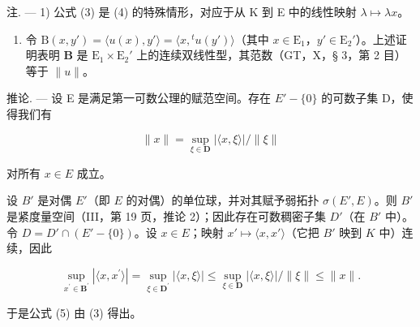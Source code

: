 注. --- 1) 公式 (3) 是 (4) 的特殊情形，对应于从 K 到 E 中的线性映射 \(\lambda \mapsto \lambda x\)。

\begin{enumerate}
\def\labelenumi{\arabic{enumi})}
\setcounter{enumi}{1}
\tightlist
\item
  令 \(\mathrm{B}(x, y') = \langle u(x), y' \rangle = \langle x, {}^t u(y') \rangle\)（其中 \(x \in \mathrm{E}_1\)，\(y' \in \mathrm{E}_2'\)）。上述证明表明 \(\mathbf{B}\) 是 \(\mathrm{E}_1 \times \mathrm{E}_2'\) 上的连续双线性型，其范数（GT，X，§ 3，第 2 目）等于 \(\| u \|\)。
\end{enumerate}

推论. --- 设 E 是满足第一可数公理的赋范空间。存在 \(E' - \{0\}\) 的可数子集 D，使得我们有

\[
\| x \| = \sup _ {\xi \in \mathbf {D}} | \langle x, \xi \rangle | / \| \xi \|\tag{5}
\]

对所有 \(x \in E\) 成立。

设 \(B'\) 是对偶 \(E'\)（即 \(E\) 的对偶）的单位球，并对其赋予弱拓扑 \(\sigma(E', E)\)。则 \(B'\) 是紧度量空间（III，第 19 页，推论 2）；因此存在可数稠密子集 \(D'\)（在 \(B'\) 中）。令 \(D = D' \cap (E' - \{0\})\)。设 \(x \in E\)；映射 \(x' \mapsto \langle x, x' \rangle\)（它把 \(B'\) 映到 \(K\) 中）连续，因此

\[
\sup _ {x ^ {\prime} \in \mathbf {B} ^ {\prime}} | \langle x, x ^ {\prime} \rangle | = \sup _ {\xi \in \mathbf {D} ^ {\prime}} | \langle x, \xi \rangle | \leqslant \sup _ {\xi \in \mathbf {D}} | \langle x, \xi \rangle | / \| \xi \| \leqslant \| x \|.
\]

于是公式 (5) 由 (3) 得出。

